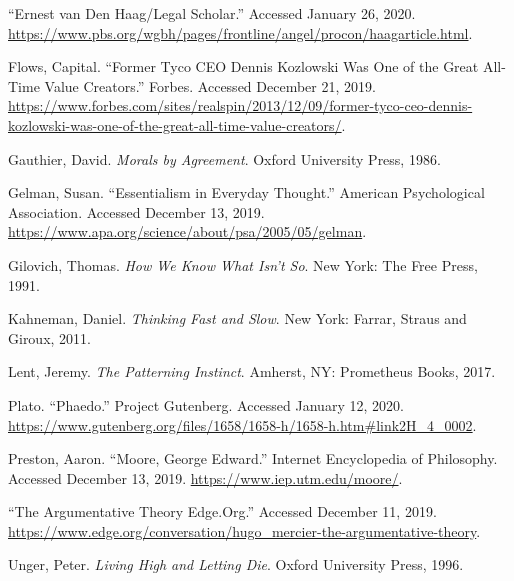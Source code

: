\documentclass[
  12pt, openany]{book}
\theoremstyle{definition}
\theoremstyle{definition}
\theoremstyle{definition}
\theoremstyle{remark}
\begin{document}
\leavevmode\hypertarget{ref-ErnestVanHaag}{}%
``Ernest van Den Haag/Legal Scholar.'' Accessed January 26, 2020. \url{https://www.pbs.org/wgbh/pages/frontline/angel/procon/haagarticle.html}.

\leavevmode\hypertarget{ref-flowsFormerTycoCEO}{}%
Flows, Capital. ``Former Tyco CEO Dennis Kozlowski Was One of the Great All-Time Value Creators.'' Forbes. Accessed December 21, 2019. \url{https://www.forbes.com/sites/realspin/2013/12/09/former-tyco-ceo-dennis-kozlowski-was-one-of-the-great-all-time-value-creators/}.

\leavevmode\hypertarget{ref-gauthierMoralsAgreement1986}{}%
Gauthier, David. \emph{Morals by Agreement}. Oxford University Press, 1986.

\leavevmode\hypertarget{ref-gelmanEssentialismEverydayThought}{}%
Gelman, Susan. ``Essentialism in Everyday Thought.'' American Psychological Association. Accessed December 13, 2019. \url{https://www.apa.org/science/about/psa/2005/05/gelman}.

\leavevmode\hypertarget{ref-gilovichHowWeKnow1991}{}%
Gilovich, Thomas. \emph{How We Know What Isn't So}. New York: The Free Press, 1991.

\leavevmode\hypertarget{ref-kahnemanThinkingFastSlow2011}{}%
Kahneman, Daniel. \emph{Thinking Fast and Slow}. New York: Farrar, Straus and Giroux, 2011.

\leavevmode\hypertarget{ref-lentPatterningInstinct2017}{}%
Lent, Jeremy. \emph{The Patterning Instinct}. Amherst, NY: Prometheus Books, 2017.

\leavevmode\hypertarget{ref-platoPhaedo}{}%
Plato. ``Phaedo.'' Project Gutenberg. Accessed January 12, 2020. \url{https://www.gutenberg.org/files/1658/1658-h/1658-h.htm\#link2H_4_0002}.

\leavevmode\hypertarget{ref-prestonMooreGeorgeEdward}{}%
Preston, Aaron. ``Moore, George Edward.'' Internet Encyclopedia of Philosophy. Accessed December 13, 2019. \url{https://www.iep.utm.edu/moore/}.

\leavevmode\hypertarget{ref-ArgumentativeTheoryEdge}{}%
``The Argumentative Theory \textbar{} Edge.Org.'' Accessed December 11, 2019. \url{https://www.edge.org/conversation/hugo_mercier-the-argumentative-theory}.

\leavevmode\hypertarget{ref-ungerLivingHighLetting1996}{}%
Unger, Peter. \emph{Living High and Letting Die}. Oxford University Press, 1996.
\end{document}
